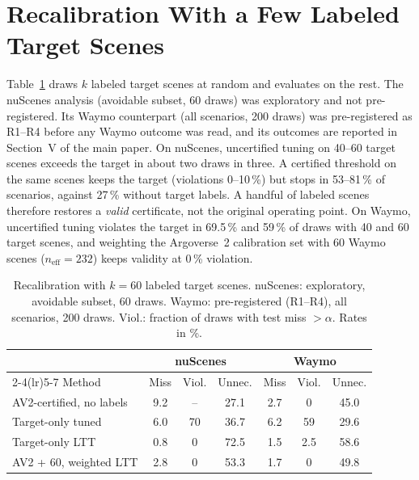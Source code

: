 \documentclass[lettersize,journal]{IEEEtran}
\begin{document}
\section{Recalibration With a Few Labeled Target Scenes}
\label{sec:s-fewshot}
Table~\ref{tab:recal} draws $k$ labeled target scenes at random and
evaluates on the rest. The nuScenes analysis (avoidable subset, 60 draws)
was exploratory and not pre-registered. Its Waymo counterpart (all
scenarios, 200 draws) was pre-registered as R1--R4 before any Waymo
outcome was read, and its outcomes are reported in Section~V of the main
paper. On nuScenes, uncertified tuning on 40--60 target scenes exceeds the
target in about two draws in three. A certified threshold on the same
scenes keeps the target (violations 0--10\,\%) but stops in 53--81\,\% of
scenarios, against 27\,\% without target labels. A handful of labeled
scenes therefore restores a \emph{valid} certificate, not the original
operating point. On Waymo, uncertified tuning violates the target in
69.5\,\% and 59\,\% of draws with 40 and 60 target scenes, and weighting
the Argoverse~2 calibration set with 60 Waymo scenes
($n_{\mathrm{eff}} = 232$) keeps validity at 0\,\% violation.

\begin{table}[h]
\caption{Recalibration with $k = 60$ labeled target scenes. nuScenes:
exploratory, avoidable subset, 60 draws. Waymo: pre-registered
(R1--R4), all scenarios, 200 draws. Viol.: fraction of draws with test
miss $>\alpha$. Rates in \%.}
\label{tab:recal}
\centering
\scriptsize\setlength{\tabcolsep}{2.5pt}
\begin{tabular}{lcccccc}
\toprule
& \multicolumn{3}{c}{nuScenes} & \multicolumn{3}{c}{Waymo} \\
\cmidrule(lr){2-4}\cmidrule(lr){5-7}
Method & Miss & Viol. & Unnec. & Miss & Viol. & Unnec. \\
\midrule
AV2-certified, no labels & 9.2 & -- & 27.1 & 2.7 & 0 & 45.0 \\
Target-only tuned & 6.0 & 70 & 36.7 & 6.2 & 59 & 29.6 \\
Target-only LTT & 0.8 & 0 & 72.5 & 1.5 & 2.5 & 58.6 \\
AV2 + 60, weighted LTT & 2.8 & 0 & 53.3 & 1.7 & 0 & 49.8 \\
\bottomrule
\end{tabular}
\end{table}
\end{document}
